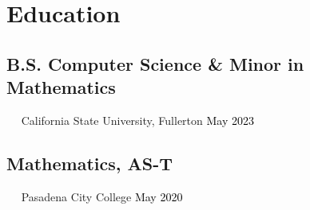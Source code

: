 \documentclass{article}
\newcommand{\resumesection}[3]{
    \subsection*{#1}
    \ 
    \ 
    \small
    \textcolor{csufgrey}{#2}
    \normalsize
    \hfill
    \textcolor{black}{#3}
    \normalsize
}
\begin{document}
\pagestyle{useheader}

\section*{Education}
\resumesection{B.S. Computer Science \& Minor in Mathematics}{California State University, Fullerton}{May 2023}%
\resumesection{Mathematics, AS-T}{Pasadena City College}{May 2020}
\end{document}
